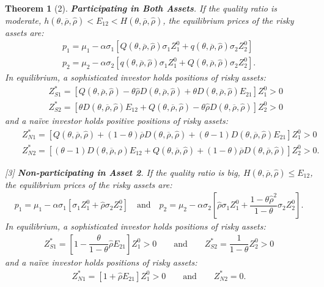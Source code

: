 \documentclass[10pt]{article}
\newtheorem{thm}{Theorem}
\begin{document}
\begin{thm}
[2] {\bf Participating in Both Assets}. If the quality ratio is moderate, $ h (\theta, \overline{\rho}, {\hat \rho}) < E_{1 2} < H (\theta, \overline{\rho}, {\hat \rho}) $, the equilibrium prices of the risky assets are:
\begin{eqnarray*}
& p_1 = \mu_1 - \alpha \sigma_1 \left[ Q (\theta, \overline{\rho}, {\hat \rho}) \sigma_1 Z_1^0 + q (\theta, \overline{\rho}, {\hat \rho}) \sigma_2 Z_2^0 \right] & \\
& p_2 = \mu_2 - \alpha \sigma_2 \left[ q (\theta, \overline{\rho}, {\hat \rho}) \sigma_1 Z_1^0 + Q (\theta, \overline{\rho}, {\hat \rho}) \sigma_2 Z_2^0 \right]. &
\end{eqnarray*}
In equilibrium, a sophisticated investor holds positions of risky assets:
\begin{eqnarray*}
& & Z_{S 1}^* = \left[ Q (\theta, \overline{\rho}, {\hat \rho}) - \theta {\hat \rho} D (\theta, \overline{\rho}, {\hat \rho}) + \theta D (\theta, \overline{\rho}, {\hat \rho}) E_{2 1} \right] Z_1^0 > 0 \\
& & Z_{S 2}^* = \left[ \theta D (\theta, \overline{\rho}, {\hat \rho}) E_{1 2} + Q (\theta, \overline{\rho}, {\hat \rho}) - \theta {\hat \rho} D (\theta, \overline{\rho}, {\hat \rho}) \right] Z_2^0 > 0
\end{eqnarray*}
and a na\"ive investor holds positive positions of risky assets:
\begin{eqnarray*}
& & Z_{N 1}^* = \left[ Q (\theta, \overline{\rho}, {\hat \rho}) + (1 - \theta) \overline{\rho} D (\theta, \overline{\rho}, {\hat \rho}) + (\theta - 1) D (\theta, \overline{\rho}, {\hat \rho}) E_{2 1} \right] Z_1^0 > 0 \\
& & Z_{N 2}^* = \left[ (\theta - 1) D (\theta, \overline{\rho}, {\hat \rho}) E_{1 2} + Q (\theta, \overline{\rho}, {\hat \rho}) + (1 - \theta) \overline{\rho} D (\theta, \overline{\rho}, {\hat \rho}) \right] Z_2^0 > 0.
\end{eqnarray*}

[3] {\bf Non-participating in Asset 2}. If the quality ratio is big, $ H (\theta, \overline{\rho}, {\hat \rho}) \leqslant E_{1 2} $, the equilibrium prices of the risky assets are:
\begin{eqnarray*}
p_1 = \mu_1 - \alpha \sigma_1 \left[ \sigma_1 Z_1^0 + {\hat \rho} \sigma_2 Z_2^0 \right] \quad \text{and} \quad p_2 = \mu_2 - \alpha \sigma_2 \left[ {\hat \rho} \sigma_1 Z_1^0 + \dfrac{1 - \theta {\hat \rho}^2}{1 - \theta} \sigma_2 Z_2^0 \right].
\end{eqnarray*}
In equilibrium, a sophisticated investor holds positions of risky assets:
\begin{eqnarray*}
Z_{S 1}^* = \left[ 1 - \dfrac{\theta}{1 - \theta} {\hat \rho} E_{2 1} \right] Z_1^0 > 0 \qquad \text{and} \qquad Z_{S 2}^* = \dfrac{1}{1 - \theta} Z_2^0 > 0
\end{eqnarray*}
and a na\"ive investor holds positions of risky assets:
\begin{eqnarray*}
Z_{N 1}^* = \left[ 1 + {\hat \rho} E_{2 1} \right] Z_1^0 > 0 \qquad \text{and} \qquad Z_{N 2}^* = 0.
\end{eqnarray*}
\end{thm}
\end{document}
